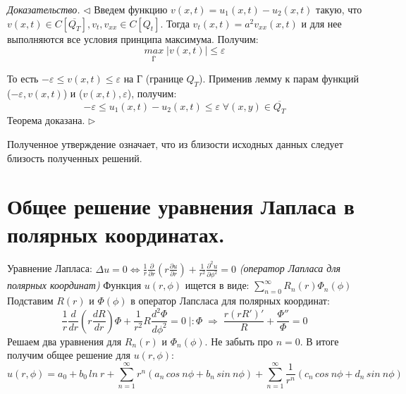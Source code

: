 \documentclass[11pt,a4paper]{article}
\begin{document}
    \textit{Доказательство.} $\triangleleft$ Введем функцию $v(x,t) = u_1(x,t) - u_2(x,t)$ такую, что $v(x,t) \in C[\overline{Q_T}], v_t, v_{xx} \in C[Q_t]$. Тогда $v_t(x,t) = a^2v_{xx}(x,t)$ и для нее выполняются все условия принципа максимума. Получим:
    $$
    \underset{\overline{Г}}{max} \; |v(x,t)| \leqslant \varepsilon
    $$
    
    То есть $-\varepsilon \leqslant v(x,t) \leqslant \varepsilon$ на Г (границе $Q_T$). Применив лемму к парам функций ($-\varepsilon, v(x,t)$) и ($v(x,t), \varepsilon$), получим:
    $$
    -\varepsilon \leqslant u_1(x,t) - u_2(x,t) \leqslant \varepsilon \; \forall (x,y) \in \overline{Q_T}
    $$
    Теорема доказана. $\triangleright$
    
    Полученное утверждение означает, что из близости исходных данных следует близость полученных
решений.
    
    \section{Общее решение уравнения Лапласа в полярных координатах.}
    Уравнение Лапласа: $\Delta u = 0 \Leftrightarrow \frac{1}{r} \frac{\partial}{\partial r}(r \frac{\partial u}{\partial r}) + \frac{1}{r^2} \frac{\partial^2 u}{\partial \phi^2} = 0$ \textit{(оператор Лапласа для полярных координат)}
    Функция $u(r,\phi)$ ищется в виде: $\sum\limits_{n=0}^{\infty} R_n(r)\Phi_n(\phi)$
    Подставим $R(r)$ и $\Phi(\phi)$ в оператор Лапсласа для полярных координат:
    $$
    \frac{1}{r} \frac{d}{dr}(r \frac{dR}{dr})\Phi + \frac{1}{r^2} R \frac{d^2 \Phi}{d \phi^2} = 0 \; |:\Phi \; \Rightarrow \;
    \frac{r(rR')'}{R} + \frac{\Phi''}{\Phi} = 0
    $$
    Решаем два уравнения для $R_n(r)$ и $\Phi_n(\phi)$. Не забыть про $n = 0$. В итоге получим общее решение для $u(r, \phi)$:
    $$
    u(r, \phi) = a_0 + b_0 \, ln\:r + \sum\limits_{n=1}^{\infty}r^n(a_n \, cos \: n \phi + b_n \, sin \: n \phi) + \sum\limits_{n=1}^{\infty}\frac{1}{r^n}(c_n \, cos \: n \phi + d_n \, sin \: n \phi)
    $$
    
\end{document}
